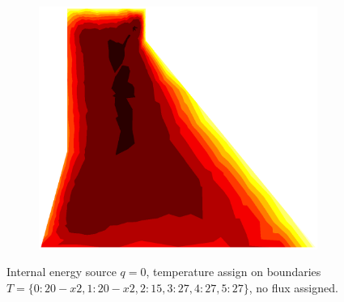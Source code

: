 \documentclass[10pt, a4paper]{article}
\begin{document}
\begin{figure}[H]
\begin{subfigure}[H]{0.19\textwidth}
		\includegraphics[width=1.2\textwidth]{fig/34.eps}
	\end{subfigure}
	\caption{Internal energy source $q=0$, temperature assign on boundaries $T=\{0:20-x2, 1:20-x2, 2:15, 3:27, 4:27, 5:27\}$, no flux assigned.}
	\label{fig:3_1}
\end{figure}
\end{document}
